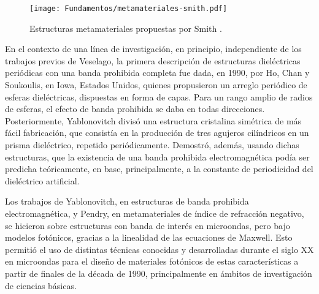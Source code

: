\begin{figure}[htp]
	\centering
	\texttt{[image: Fundamentos/metamateriales-smith.pdf]}
	\caption{Estructuras metamateriales propuestas por Smith \cite{Caloz:ElectromagneticMetamaterials}.}
	\label{fig:metamaterial-de-smith}
\end{figure}

En el contexto de una línea de investigación, en principio, independiente de los trabajos previos de Veselago, la primera descripción de estructuras dieléctricas periódicas con una banda prohibida completa fue dada, en 1990, por Ho, Chan y Soukoulis, en Iowa, Estados Unidos, quienes propusieron un arreglo periódico de esferas dieléctricas, dispuestas en forma de capas. Para un rango amplio de radios de esferas, el efecto de banda prohibida se daba en todas direcciones. Posteriormente, Yablonovitch divisó una estructura cristalina simétrica de más fácil fabricación, que consistía en la producción de tres agujeros cilíndricos en un prisma dieléctrico, repetido periódicamente. Demostró, además, usando dichas estructuras, que la existencia de una banda prohibida electromagnética podía ser predicha teóricamente, en base, principalmente, a la constante de periodicidad del dieléctrico artificial.

Los trabajos de Yablonovitch, en estructuras de banda prohibida electromagnética, y Pendry, en metamateriales de índice de refracción negativo, se hicieron sobre estructuras con banda de interés en microondas, pero bajo modelos fotónicos, gracias a la linealidad de las ecuaciones de Maxwell. Esto permitió el uso de distintas técnicas conocidas y desarrolladas durante el siglo XX en microondas para el diseño de materiales fotónicos de estas características a partir de finales de la década de 1990, principalmente en ámbitos de investigación de ciencias básicas.

